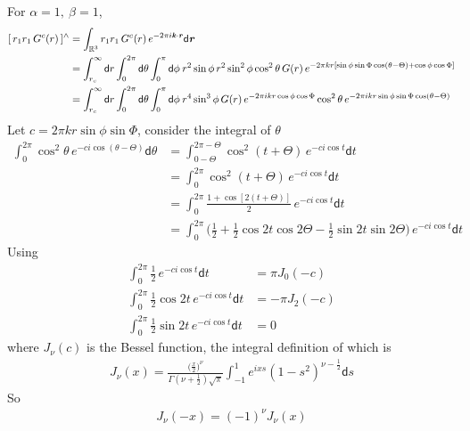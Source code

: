 \documentclass[aps,pre,preprint]{revtex4}
\renewcommand{\v}[1]{\textbf{\textit{#1}}}
\renewcommand{\d}[1]{\textsf{#1}}
\begin{document}
For $\alpha = 1,\ \beta = 1$,
\begin{align}\nonumber
  [\,r_1r_1\,G^c(r)\,]^{\wedge} 
  &= \int_{\mathbb R^3} r_1r_1\,G^c(r)\, e^{-2\pi i\v k\cdot\v r}\d d\v r \\\nonumber
  &= \int_{r_c}^\infty \d dr \int_{0}^{2\pi} \d d\theta \int_0^\pi\d d\phi\:
  r^2\sin\phi \,r^2 \sin^2\phi\cos^2\theta\,G(r)\,
  e^{-2\pi k r[\sin\phi\sin\Phi\cos(\theta - \Theta) + \cos\phi\cos\Phi]} \\
  &= \int_{r_c}^\infty \d dr \int_{0}^{2\pi} \d d\theta \int_0^\pi\d d\phi\:
  r^4\sin^3\phi\,G(r)\,e^{-2\pi i kr\cos\phi\cos\Phi}
  \cos^2\theta\,e^{-2\pi i kr\sin\phi\sin\Phi\cos(\theta- \Theta)}
\end{align}
Let $c = 2\pi kr\sin\phi\sin\Phi$, consider the integral of $\theta$
\begin{align}\nonumber
  \int_0^{2\pi} \cos^2\theta\,e^{-ci\cos(\theta - \Theta)}\d d\theta
  & =
  \int_{0-\Theta}^{2\pi-\Theta} \cos^2(t + \Theta) \, e^{-ci\cos t}\d dt \\\nonumber
  & = 
  \int_0^{2\pi}\cos^2(t + \Theta)\, e^{-ci\cos t} \d dt \\\nonumber
  & = 
  \int_0^{2\pi}\frac{1 + \cos[2(t + \Theta)]}2 \, e^{-ci\cos t} \d dt \\\nonumber  
  & = 
  \int_0^{2\pi}
  \Big(
  \frac12 + \frac12\cos 2t\cos 2\Theta - \frac12\sin 2t\sin 2\Theta
  \Big)
  \, e^{-ci\cos t} \d d t
\end{align}
Using
\begin{align}\label{eqn:tmp31}
  \int_0^{2\pi} \frac12 \,e^{-ci\cos t}\d dt &= \pi J_0(-c) \\\label{eqn:tmp32}
  \int_0^{2\pi} \frac12\cos 2t \,e^{-ci\cos t}\d dt &= -\pi J_2(-c) \\\label{eqn:tmp33}
  \int_0^{2\pi} \frac12\sin 2t \,e^{-ci\cos t}\d dt &= 0 
\end{align}
where $J_\nu(c)$ is the Bessel function, the integral definition of which is
\begin{align}
  J_\nu(x) =
  \frac
  {\big({\frac x2}\big)^\nu}
  {\Gamma(\nu + \frac12)\sqrt\pi}
  \int_{-1}^1e^{ixs}(1-s^2)^{\nu-\frac12}\d ds
\end{align}
So
\begin{align}
  J_\nu(-x) = (-1)^\nu J_\nu(x)
\end{align}
\end{document}
